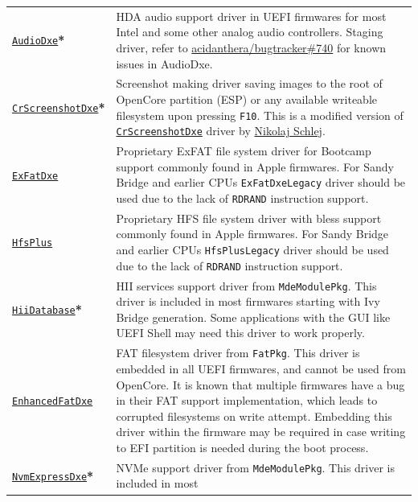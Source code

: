 \documentclass[]{article}
\begin{document}
\begin{tabular}{p{1.3in}p{5.55in}}
\href{https://github.com/acidanthera/OpenCorePkg}{\texttt{AudioDxe}}\textbf{*}
& HDA audio support driver in UEFI firmwares for most Intel and some other analog audio controllers.
  Staging driver, refer to \href{https://github.com/acidanthera/bugtracker/issues/740}{acidanthera/bugtracker\#740}
  for known issues in AudioDxe. \\
\href{https://github.com/acidanthera/OpenCorePkg}{\texttt{CrScreenshotDxe}}\textbf{*}
& Screenshot making driver saving images to the root of OpenCore partition (ESP) or
  any available writeable filesystem upon pressing \texttt{F10}.
  This is a modified version of \href{https://github.com/LongSoft/CrScreenshotDxe}{\texttt{CrScreenshotDxe}}
  driver by \href{https://github.com/NikolajSchlej}{Nikolaj Schlej}. \\
\href{https://github.com/acidanthera/OcBinaryData}{\texttt{ExFatDxe}}
& Proprietary ExFAT file system driver for Bootcamp support commonly found in Apple
  firmwares. For Sandy Bridge and earlier CPUs \texttt{ExFatDxeLegacy} driver should be
  used due to the lack of \texttt{RDRAND} instruction support. \\
\href{https://github.com/acidanthera/OcBinaryData}{\texttt{HfsPlus}}
& Proprietary HFS file system driver with bless support commonly found in Apple
  firmwares. For Sandy Bridge and earlier CPUs \texttt{HfsPlusLegacy} driver should be
  used due to the lack of \texttt{RDRAND} instruction support. \\
\href{https://github.com/acidanthera/audk}{\texttt{HiiDatabase}}\textbf{*}
& HII services support driver from \texttt{MdeModulePkg}. This driver is included in
  most firmwares starting with Ivy Bridge generation. Some applications with the GUI
  like UEFI Shell may need this driver to work properly. \\
\href{https://github.com/acidanthera/audk}{\texttt{EnhancedFatDxe}}
& FAT filesystem driver from \texttt{FatPkg}. This driver is embedded in all
  UEFI firmwares, and cannot be used from OpenCore. It is known that multiple firmwares
  have a bug in their FAT support implementation, which leads to corrupted filesystems
  on write attempt. Embedding this driver within the firmware may be required in case
  writing to EFI partition is needed during the boot process. \\
  \href{https://github.com/acidanthera/audk}{\texttt{NvmExpressDxe}}\textbf{*}
& NVMe support driver from \texttt{MdeModulePkg}. This driver is included in most

\end{tabular}
\end{document}
